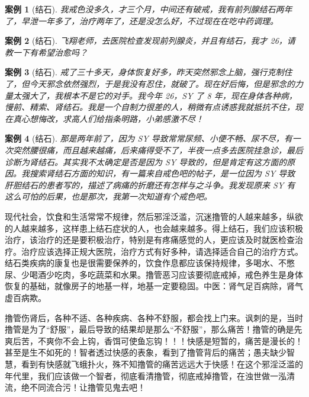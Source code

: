 \documentclass{ctexart}
\newtheorem{case}{案例}
\begin{document}
\begin{case}[结石]\it
    我戒色没多久，才三个月，中间还有破戒，我有前列腺结石两年了，早泄一年多了，治疗两年了，还是没怎么好，不过现在在吃中药调理。
\end{case}

\begin{case}[结石]\it
    飞翔老师，去医院检查发现前列腺炎，并且有结石，我才 26，请教一下有希望治愈吗？
\end{case}

\begin{case}[结石]\it
    戒了三十多天，身体恢复好多，昨天突然邪念上脑，强行克制住了，但今天邪念依然强烈，于是我没有忍住，就破了。现在好后悔，但是邪念的力量太强大了，我根本不是它的对手。我今年 26，SY 了 8 年，现在身体各种病，慢前、精索、肾结石。我是一个自制力很差的人，稍微有点诱惑我就抵抗不住，现在真心想悔改，求高人们给指条明路，小弟感激不尽！
\end{case}

\begin{case}[结石]\it
    那是两年前了，因为 SY 导致常常尿频、小便不畅、尿不尽，有一次突然腰很痛，而且越来越痛，后来痛得受不了，半夜一点多去医院挂急诊，最后诊断为肾结石。其实我不太确定是否是因为 SY 导致的，但是肯定有这方面的原因。我搜索肾结石方面的知识，有一篇来自戒色吧的帖子，是一位因为 SY 导致肝胆结石的患者写的，描述了病痛的折磨还有怎样与之斗争。我发现原来 SY 有这么可怕的后果，也是那次，我第一次知道有个戒色吧。
\end{case}

现代社会，饮食和生活常常不规律，然后邪淫泛滥，沉迷撸管的人越来越多，纵欲的人越来越多，这样患上结石症状的人，也会越来越多。得上结石，我们应该积极治疗，该治疗的还是要积极治疗，特别是有疼痛感觉的人，更应该及时就医检查治疗。治疗应该选择正规大医院，治疗方式有好多种，请选择适合自己的治疗方式。结石类疾病的康复也是很需要保养的，饮食作息都应该保持规律，多喝水、不憋尿、少喝酒少吃肉，多吃蔬菜和水果。撸管恶习应该要彻底戒掉，戒色养生是身体恢复的基础，就像房子的地基一样，地基一定要稳固。中医：肾气足百病除，肾气虚百病欺。

撸管伤肾后，各种不适、各种疾病、各种不舒服，都会找上门来。讽刺的是，当时撸管是为了“舒服”，最后导致的结果却是那么“不舒服”，那么痛苦！撸管的确是先爽后苦，不爽你不会上钩，香饵可使鱼忘钩！！！快感是短暂的，痛苦是漫长的！甚至是生不如死的！智者透过快感的表象，看到了撸管背后的痛苦；愚夫缺少智慧，看到有快感就飞蛾扑火，殊不知撸管的痛苦远远大于快感！在这个邪淫泛滥的年代里，我们应该做一个智者，彻底看清撸管，彻底戒掉撸管，在浊世做一泓清流，绝不同流合污！让撸管见鬼去吧！
\end{document}
